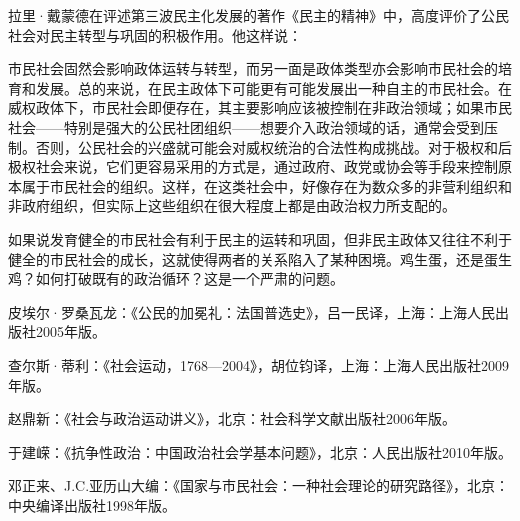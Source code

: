 拉里·戴蒙德在评述第三波民主化发展的著作《民主的精神》中，高度评价了公民社会对民主转型与巩固的积极作用。他这样说：


市民社会固然会影响政体运转与转型，而另一面是政体类型亦会影响市民社会的培育和发展。总的来说，在民主政体下可能更有可能发展出一种自主的市民社会。在威权政体下，市民社会即便存在，其主要影响应该被控制在非政治领域；如果市民社会——特别是强大的公民社团组织——想要介入政治领域的话，通常会受到压制。否则，公民社会的兴盛就可能会对威权统治的合法性构成挑战。对于极权和后极权社会来说，它们更容易采用的方式是，通过政府、政党或协会等手段来控制原本属于市民社会的组织。这样，在这类社会中，好像存在为数众多的非营利组织和非政府组织，但实际上这些组织在很大程度上都是由政治权力所支配的。

如果说发育健全的市民社会有利于民主的运转和巩固，但非民主政体又往往不利于健全的市民社会的成长，这就使得两者的关系陷入了某种困境。鸡生蛋，还是蛋生鸡？如何打破既有的政治循环？这是一个严肃的问题。


皮埃尔·罗桑瓦龙：《公民的加冕礼：法国普选史》，吕一民译，上海：上海人民出版社2005年版。

查尔斯·蒂利：《社会运动，1768—2004》，胡位钧译，上海：上海人民出版社2009年版。

赵鼎新：《社会与政治运动讲义》，北京：社会科学文献出版社2006年版。

于建嵘：《抗争性政治：中国政治社会学基本问题》，北京：人民出版社2010年版。

邓正来、J.C.亚历山大编：《国家与市民社会：一种社会理论的研究路径》，北京：中央编译出版社1998年版。
